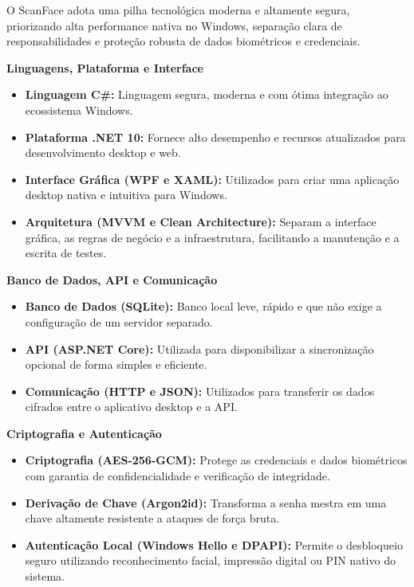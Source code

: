 \documentclass{article}
\begin{document}
O ScanFace adota uma pilha tecnológica moderna e altamente segura, priorizando alta performance nativa no Windows, separação clara de responsabilidades e proteção robusta de dados biométricos e credenciais.

\vspace{0.4cm}

\textbf{Linguagens, Plataforma e Interface}
\begin{itemize}[leftmargin=*]
    \item \textbf{Linguagem C\#:} Linguagem segura, moderna e com ótima integração ao ecossistema Windows.
    \item \textbf{Plataforma .NET 10:} Fornece alto desempenho e recursos atualizados para desenvolvimento desktop e web.
    \item \textbf{Interface Gráfica (WPF e XAML):} Utilizados para criar uma aplicação desktop nativa e intuitiva para Windows.
    \item \textbf{Arquitetura (MVVM e Clean Architecture):} Separam a interface gráfica, as regras de negócio e a infraestrutura, facilitando a manutenção e a escrita de testes.
\end{itemize}

\vspace{0.3cm}

\textbf{Banco de Dados, API e Comunicação}
\begin{itemize}[leftmargin=*]
    \item \textbf{Banco de Dados (SQLite):} Banco local leve, rápido e que não exige a configuração de um servidor separado.
    \item \textbf{API (ASP.NET Core):} Utilizada para disponibilizar a sincronização opcional de forma simples e eficiente.
    \item \textbf{Comunicação (HTTP e JSON):} Utilizados para transferir os dados cifrados entre o aplicativo desktop e a API.
\end{itemize}

\vspace{0.3cm}

\textbf{Criptografia e Autenticação}
\begin{itemize}[leftmargin=*]
    \item \textbf{Criptografia (AES-256-GCM):} Protege as credenciais e dados biométricos com garantia de confidencialidade e verificação de integridade.
    \item \textbf{Derivação de Chave (Argon2id):} Transforma a senha mestra em uma chave altamente resistente a ataques de força bruta.
    \item \textbf{Autenticação Local (Windows Hello e DPAPI):} Permite o desbloqueio seguro utilizando reconhecimento facial, impressão digital ou PIN nativo do sistema.
\end{itemize}
\end{document}
